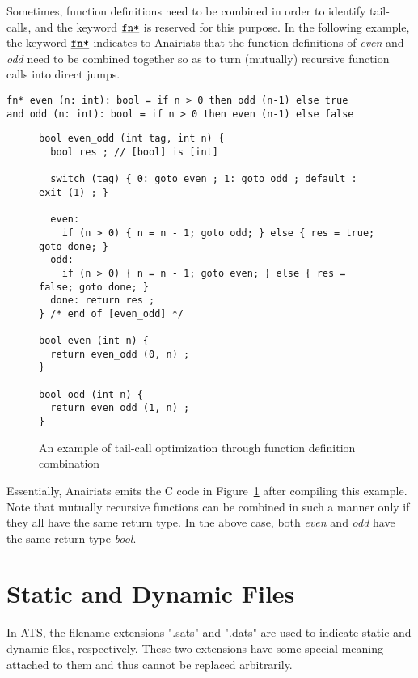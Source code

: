 Sometimes, function definitions need to be combined in order to identify
tail-calls, and the keyword $\underline{\texttt{fn*}}$ is reserved for this purpose. In
the following example, the keyword $\underline{\texttt{fn*}}$ indicates to Anairiats that
the function definitions of {\it even} and {\it odd} need to be combined
together so as to turn (mutually) recursive function calls into direct
jumps.
\begin{verbatim}
fn* even (n: int): bool = if n > 0 then odd (n-1) else true
and odd (n: int): bool = if n > 0 then even (n-1) else false
\end{verbatim}
\begin{figure}[thp]
\begin{verbatim}
bool even_odd (int tag, int n) {
  bool res ; // [bool] is [int]

  switch (tag) { 0: goto even ; 1: goto odd ; default : exit (1) ; }

  even:
    if (n > 0) { n = n - 1; goto odd; } else { res = true; goto done; }
  odd:
    if (n > 0) { n = n - 1; goto even; } else { res = false; goto done; }
  done: return res ;
} /* end of [even_odd] */

bool even (int n) {
  return even_odd (0, n) ;
}

bool odd (int n) {
  return even_odd (1, n) ;
}
\end{verbatim}
\caption{An example of tail-call optimization through function definition combination}
\label{figure:even_odd_combination_in_c}
\end{figure}
Essentially, Anairiats emits the C code in
Figure~\ref{figure:even_odd_combination_in_c} after compiling this
example. Note that mutually recursive functions can be combined in such a
manner only if they all have the same return type. In the above case, both
{\it even} and {\it odd} have the same return type {\it bool}.


\section{Static and Dynamic Files}
In ATS, the filename extensions ".sats" and ".dats" are used to indicate
static and dynamic files, respectively. These two extensions have some
special meaning attached to them and thus cannot be replaced arbitrarily.

